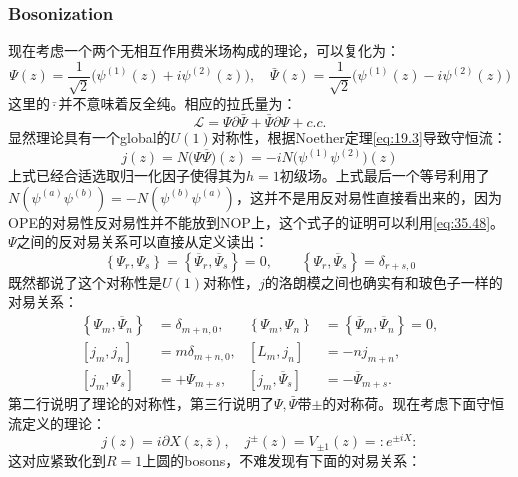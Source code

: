 \subsubsection{Bosonization}
现在考虑一个两个无相互作用费米场构成的理论，可以复化为：
\begin{equation}
	\Psi(z)=\frac1{\sqrt{2}}\Big(\psi^{(1)}(z)+i\psi^{(2)}(z)\Big),\quad \bar\Psi(z)=\frac1{\sqrt{2}}\Big(\psi^{(1)}(z)-i\psi^{(2)}(z)\Big)
\end{equation}
这里的$\bar{\cdot}$并不意味着反全纯。相应的拉氏量为：
\begin{equation}
	\mathcal{L}=\Psi\partial\bar \Psi+\bar \Psi\partial\Psi+c.c.
\end{equation}
显然理论具有一个global的$U(1)$对称性，根据Noether定理\ref{eq:19.3}导致守恒流：
\begin{equation}
	j(z)=N\big(\Psi\overline{\Psi}\big)(z)=-iN\big(\psi^{(1)}\psi^{(2)}\big)(z)
\end{equation}
上式已经合适选取归一化因子使得其为$h=1$初级场。上式最后一个等号利用了$N(\psi^{(a)}\psi^{(b)})=-N(\psi^{(b)}\psi^{(a)})$，这并不是用反对易性直接看出来的，因为OPE的对易性反对易性并不能放到NOP上，这个式子的证明可以利用\ref{eq:35.48}。$\Psi$之间的反对易关系可以直接从定义读出：
\begin{equation}
	\left\{\Psi_r,\Psi_s\right\}=\left\{\overline{\Psi}_r,\overline{\Psi}_s\right\}=0,\quad\quad\left\{\Psi_r,\overline{\Psi}_s\right\}=\delta_{r+s,0}
\end{equation}
既然都说了这个对称性是$U(1)$对称性，$j$的洛朗模之间也确实有和玻色子一样的对易关系：
\begin{equation}\label{b1}
	\boxed{
			\begin{aligned}
			\left\{\Psi_m,\overline{\Psi}_n\right\}&=\delta_{m+n,0},&\left\{\Psi_m,\Psi_n\right\}&=\left\{\overline{\Psi}_m,\overline{\Psi}_n\right\}=0,\\
			\left[j_m,j_n\right]&=m\delta_{m+n,0},&\left[L_m,j_n\right]&=-nj_{m+n},\\
			\left[j_m,\Psi_s\right]&=+\Psi_{m+s},&\left[j_m,\overline{\Psi}_s\right]&=-\overline{\Psi}_{m+s}.
		\end{aligned}
	}
\end{equation}
第二行说明了理论的对称性，第三行说明了$\Psi,\bar \Psi$带$\pm$的对称荷。现在考虑下面守恒流定义的理论：
\begin{equation}
	j(z)=i\partial X(z,\overline{z}),\quad j^{\pm}(z)=V_{\pm1}(z)=:e^{\pm iX}:
\end{equation}
这对应紧致化到$R=1$上圆的bosons，不难发现有下面的对易关系：
